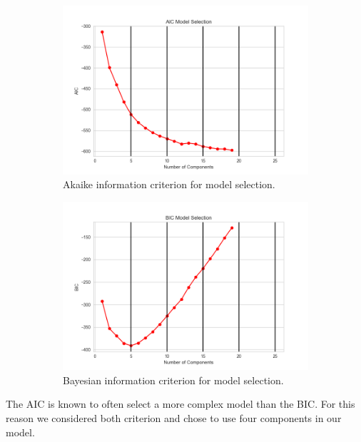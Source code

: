 \documentclass{article}
\begin{document}
\begin{figure}[H]
\begin{subfigure}[t]{0.45\textwidth}
\centering
\includegraphics[width=.99\textwidth]{../figs/aic_model.png}
\caption{Akaike information criterion for model selection.}
\label{fig:subim1}
\end{subfigure}\hfill
\begin{subfigure}[t]{0.45\textwidth}
\centering
\includegraphics[width=.99\textwidth]{../figs/bic_model.png}
\caption{Bayesian information criterion for model selection.}
\label{fig:subim2}
\end{subfigure}
\caption{}
\label{fig:image2}
\end{figure}
\noindent
The AIC is known to often select a more complex model than the BIC. For this reason we considered both criterion and chose to use four components in our model.
\newline
\end{document}
